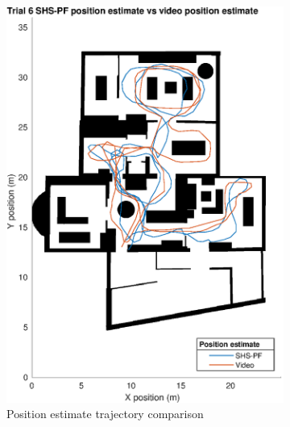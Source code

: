  \begin{figure}[H]
 	\centering
 	\begin{subfigure}[t]{.45\textwidth}
 		\centering
 		\includegraphics[width=0.95\linewidth]{images/20201129_1857_trial_6_map_1}
 		\caption{Position estimate trajectory comparison}
 		\label{fig:shspf_trial6_on_map}
 	\end{subfigure}
 	\begin{subfigure}[t]{.45\textwidth}
 		\centering

\end{subfigure}
\end{figure}
